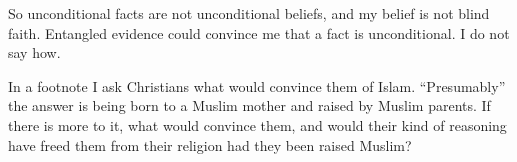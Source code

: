 So unconditional facts are not unconditional beliefs, and my belief is not blind faith. Entangled evidence could convince me that a fact is unconditional. I do not say how. 

In a footnote I ask Christians what would convince them of Islam. ``Presumably'' the answer is being born to a Muslim mother and raised by Muslim parents. If there is more to it, what would convince them, and would their kind of reasoning have freed them from their religion had they been raised Muslim? 
